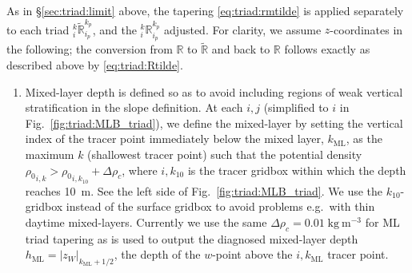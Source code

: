 As in \S\ref{sec:triad:limit} above, the tapering
\eqref{eq:triad:rmtilde} is applied separately to each triad
$_i^k\tilde{\mathbb{R}}_{i_p}^{k_p}$, and the
$_i^k\mathbb{R}_{i_p}^{k_p}$ adjusted. For clarity, we assume
$z$-coordinates in the following; the conversion from
$\mathbb{R}$ to $\tilde{\mathbb{R}}$ and back to $\mathbb{R}$ follows exactly as described
above by \eqref{eq:triad:Rtilde}.
\begin{enumerate}
\item Mixed-layer depth is defined so as to avoid including regions of weak
vertical stratification in the slope definition.
 At each $i,j$ (simplified to $i$ in
Fig.~\ref{fig:triad:MLB_triad}), we define the mixed-layer by setting
the vertical index of the tracer point immediately below the mixed
layer, $k_\mathrm{ML}$, as the maximum $k$ (shallowest tracer point)
such that the potential density
${\rho_0}_{i,k}>{\rho_0}_{i,k_{10}}+\Delta\rho_c$, where $i,k_{10}$ is
the tracer gridbox within which the depth reaches 10~m. See the left
side of Fig.~\ref{fig:triad:MLB_triad}. We use the $k_{10}$-gridbox
instead of the surface gridbox to avoid problems e.g.\ with thin
daytime mixed-layers. Currently we use the same
$\Delta\rho_c=0.01\;\mathrm{kg\:m^{-3}}$ for ML triad tapering as is
used to output the diagnosed mixed-layer depth
$h_\mathrm{ML}=|z_{W}|_{k_\mathrm{ML}+1/2}$, the depth of the $w$-point
above the $i,k_\mathrm{ML}$ tracer point.


\end{enumerate}
